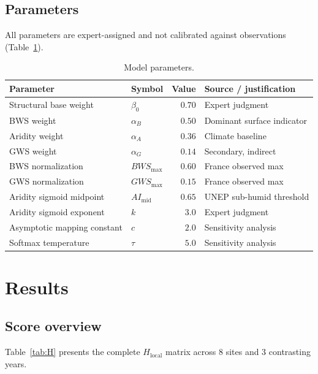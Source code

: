 \documentclass[11pt,a4paper]{article}
\begin{document}
\subsection{Parameters}

All parameters are expert-assigned and not calibrated against observations (Table~\ref{tab:params}).

\begin{table}[h]
\centering
\small
\caption{Model parameters.}
\label{tab:params}
\begin{tabular}{llrl}
\toprule
Parameter & Symbol & Value & Source / justification \\
\midrule
Structural base weight      & $\beta_0$          & $0.70$  & Expert judgment \\
BWS weight                  & $\alpha_B$         & $0.50$  & Dominant surface indicator \\
Aridity weight              & $\alpha_A$         & $0.36$  & Climate baseline \\
GWS weight                  & $\alpha_G$         & $0.14$  & Secondary, indirect \\
BWS normalization           & $BWS_{\max}$       & $0.60$  & France observed max \\
GWS normalization           & $GWS_{\max}$       & $0.15$  & France observed max \\
Aridity sigmoid midpoint    & $AI_{\text{mid}}$  & $0.65$  & UNEP sub-humid threshold \\
Aridity sigmoid exponent    & $k$                & $3.0$   & Expert judgment \\
Asymptotic mapping constant & $c$                & $2.0$   & Sensitivity analysis \\
Softmax temperature         & $\tau$             & $5.0$   & Sensitivity analysis \\
\bottomrule
\end{tabular}
\end{table}

\section{Results}

\subsection{Score overview}

Table~\ref{tab:H} presents the complete $H_{\text{local}}$ matrix across 8 sites and 3 contrasting years.
\end{document}
